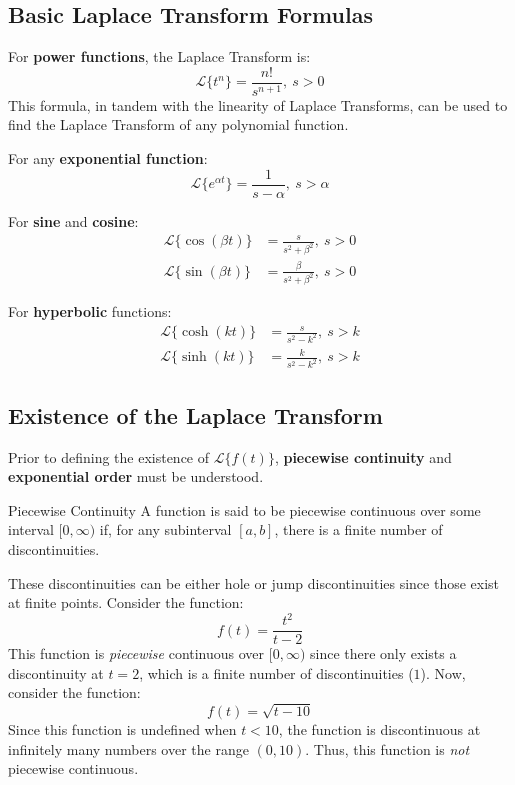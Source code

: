 \documentclass[12pt]{article}
\begin{document}
\subsection{Basic Laplace Transform Formulas}
\label{ssec:basicLaplaceTransformFormulas}

For \textbf{power functions}, the Laplace Transform is:
\begin{equation*}
  \mathcal{L}\big\{ t^n \big\} = \frac{n!}{s^{n+1}},\ s>0
\end{equation*}
This formula, in tandem with the linearity of Laplace Transforms, can be used to find the Laplace Transform of any polynomial function.

For any \textbf{exponential function}:
\begin{equation*}
  \mathcal{L}\big\{ e^{\alpha t} \big\} = \frac{1}{s- \alpha},\ s>\alpha
\end{equation*}

For \textbf{sine} and \textbf{cosine}:
\begin{align*}
  \mathcal{L}\big\{\cos(\beta t) \big\} &= \frac{s}{s^2 + \beta^2},\ s>0 \\
  \mathcal{L}\big\{\sin(\beta t) \big\} &= \frac{\beta}{s^2 + \beta^2},\ s>0
\end{align*}

For \textbf{hyperbolic} functions:
\begin{align*}
  \mathcal{L}\big\{\cosh(kt) \big\} &= \frac{s}{s^2 - k^2},\ s>k \\
  \mathcal{L}\big\{\sinh(kt) \big\} &= \frac{k}{s^2 - k^2},\ s>k
\end{align*}

\subsection{Existence of the Laplace Transform}
\label{ssec:existenceOfTheLaplaceTransform}

Prior to defining the existence of $\mathcal{L}\big\{f(t)\big\}$, \textbf{piecewise continuity} and \textbf{exponential order} must be understood.

\begin{definition}{Piecewise Continuity}
  A function is said to be piecewise continuous over some interval $[0,\infty)$ if, for any subinterval $[a,b]$, there is a finite number of discontinuities.
\end{definition}

These discontinuities can be either hole or jump discontinuities since those exist at finite points. Consider the function:
\begin{equation*}
  f(t) = \frac{t^2}{t-2}
\end{equation*}
This function is \textit{piecewise} continuous over $[0,\infty)$ since there only exists a discontinuity at $t=2$, which is a finite number of discontinuities ($1$). Now, consider the function:
\begin{equation*}
  f(t) = \sqrt{t-10}
\end{equation*}
Since this function is undefined when $t<10$, the function is discontinuous at infinitely many numbers over the range $(0,10)$. Thus, this function is \textit{not} piecewise continuous.
\end{document}
